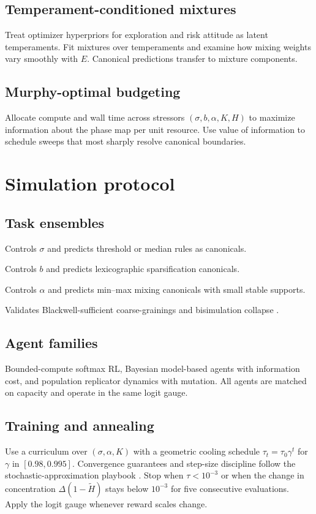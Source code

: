 \documentclass[11pt]{article}
\newcommand{\1}{\mathbbm{1}}
\begin{document}
\subsection{Temperament-conditioned mixtures}
Treat optimizer hyperpriors for exploration and risk attitude as latent temperaments. Fit mixtures over temperaments and examine how mixing weights vary smoothly with $E$. Canonical predictions transfer to mixture components.

\subsection{Murphy-optimal budgeting}
Allocate compute and wall time across stressors $(\sigma,b,\alpha,K,H)$ to maximize information about the phase map per unit resource. Use value of information to schedule sweeps that most sharply resolve canonical boundaries.

\section{Simulation protocol}
\subsection{Task ensembles}
\begin{description}[leftmargin=2em]
    \item[T1: Noisy majority POMDP] Controls $\sigma$ and predicts threshold or median rules as canonicals.
    \item[T2: Sparse-value bandit or MDP] Controls $b$ and predicts lexicographic sparsification canonicals.
    \item[T3: Zero-sum grid adversary] Controls $\alpha$ and predicts min–max mixing canonicals with small stable supports.
    \item[T4: Alias-heavy POMDP] Validates Blackwell-sufficient coarse-grainings and bisimulation collapse \parencite{Blackwell1953}.
\end{description}

\subsection{Agent families}
Bounded-compute softmax RL, Bayesian model-based agents with information cost, and population replicator dynamics with mutation. All agents are matched on capacity and operate in the same logit gauge.

\subsection{Training and annealing}
Use a curriculum over $(\sigma,\alpha,K)$ with a geometric cooling schedule $\tau_t = \tau_0 \gamma^t$ for $\gamma$ in $[0.98,0.995]$. Convergence guarantees and step-size discipline follow the stochastic-approximation playbook \parencite{Borkar2008}. Stop when $\tau < 10^{-3}$ or when the change in concentration $\Delta(1 - \tilde H)$ stays below $10^{-3}$ for five consecutive evaluations. Apply the logit gauge whenever reward scales change.
\end{document}
